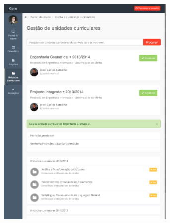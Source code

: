 \begin{figure}[H]
\begin{subfigure}{0.55\textwidth}
	 	\includegraphics[width=0.95\textwidth,center]{images/implementacao/alunos/ucs}
	 	\label{fig:ucs_small}
 	\end{subfigure}
 \end{figure}


